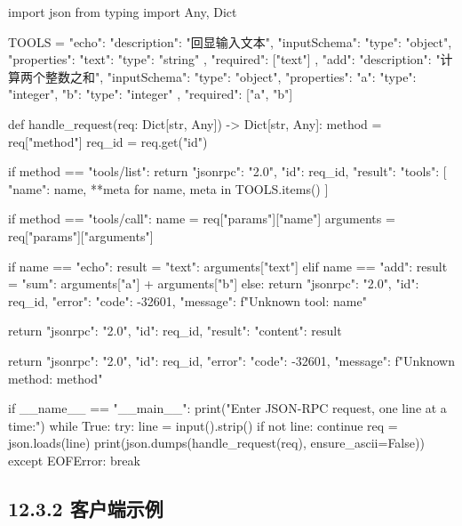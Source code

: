 \begin{codeblock}
import json
from typing import Any, Dict


TOOLS = {
    "echo": {
        "description": "回显输入文本",
        "inputSchema": {
            "type": "object",
            "properties": {
                "text": {"type": "string"}
            },
            "required": ["text"]
        }
    },
    "add": {
        "description": "计算两个整数之和",
        "inputSchema": {
            "type": "object",
            "properties": {
                "a": {"type": "integer"},
                "b": {"type": "integer"}
            },
            "required": ["a", "b"]
        }
    }
}


def handle_request(req: Dict[str, Any]) -> Dict[str, Any]:
    method = req["method"]
    req_id = req.get("id")

    if method == "tools/list":
        return {
            "jsonrpc": "2.0",
            "id": req_id,
            "result": {
                "tools": [
                    {"name": name, **meta}
                    for name, meta in TOOLS.items()
                ]
            }
        }

    if method == "tools/call":
        name = req["params"]["name"]
        arguments = req["params"]["arguments"]

        if name == "echo":
            result = {"text": arguments["text"]}
        elif name == "add":
            result = {"sum": arguments["a"] + arguments["b"]}
        else:
            return {
                "jsonrpc": "2.0",
                "id": req_id,
                "error": {"code": -32601, "message": f"Unknown tool: {name}"}
            }

        return {
            "jsonrpc": "2.0",
            "id": req_id,
            "result": {"content": result}
        }

    return {
        "jsonrpc": "2.0",
        "id": req_id,
        "error": {"code": -32601, "message": f"Unknown method: {method}"}
    }


if __name__ == "__main__":
    print("Enter JSON-RPC request, one line at a time:")
    while True:
        try:
            line = input().strip()
            if not line:
                continue
            req = json.loads(line)
            print(json.dumps(handle_request(req), ensure_ascii=False))
        except EOFError:
            break
\end{codeblock}

\subsection{12.3.2 客户端示例}

